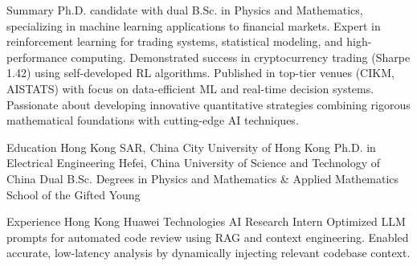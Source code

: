 \documentclass[caps, english]{financecv}
\begin{document}
\begin{cvsection}{Summary}
    Ph.D. candidate with dual B.Sc. in Physics and Mathematics, specializing in machine learning applications to financial markets. Expert in reinforcement learning for trading systems, statistical modeling, and high-performance computing. Demonstrated success in cryptocurrency trading (Sharpe 1.42) using self-developed RL algorithms. Published in top-tier venues (CIKM, AISTATS) with focus on data-efficient ML and real-time decision systems. Passionate about developing innovative quantitative strategies combining rigorous mathematical foundations with cutting-edge AI techniques.
\end{cvsection}

\begin{cvsection}{Education}
    {Hong Kong SAR, China}
    {City University of Hong Kong}
    {}
    {Ph.D. in Electrical Engineering}
    {}
    {}
    {}
    {Hefei, China}
    {University of Science and Technology of China}
    {}
    {Dual B.Sc. Degrees in Physics and Mathematics \& Applied Mathematics}
    {School of the Gifted Young}
    {}
    {}
\end{cvsection}

\begin{cvsection}{Experience}
    {Hong Kong}
    {Huawei Technologies}
    {AI Research Intern}
    {Optimized LLM prompts for automated code review using RAG and context engineering. Enabled accurate, low-latency analysis by dynamically injecting relevant codebase context.}
    {}
    {}
    {}
\end{cvsection}
\end{document}
